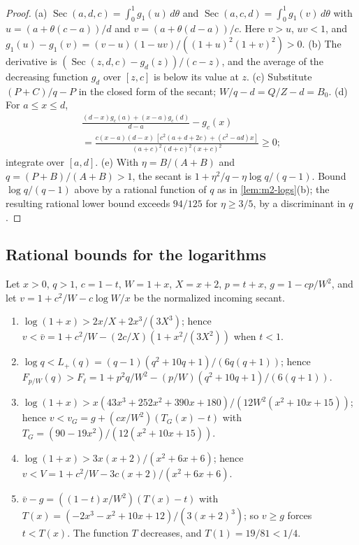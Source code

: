 \begin{proof}
(a) $\operatorname{Sec}(a,d,c)=\int_0^1g_1(u)\,d\theta$ and $\operatorname{Sec}(a,c,d)=\int_0^1g_1(v)\,d\theta$
with $u=(a+\theta(c-a))/d$ and $v=(a+\theta(d-a))/c$. Here $v>u$, $uv<1$, and
$g_1(u)-g_1(v)=(v-u)(1-uv)/((1+u)^2(1+v)^2)>0$.
(b) The derivative is $(\operatorname{Sec}(z,d,c)-g_d(z))/(c-z)$, and the average of the decreasing
function $g_d$ over $[z,c]$ is below its value at $z$.
(c) Substitute $(P+C)/q-P$ in the closed form of the secant; $W/q-d=Q/Z-d=B_0$.
(d) For $a\le x\le d$,
\begin{multline*}
\frac{(d-x)g_c(a)+(x-a)g_c(d)}{d-a}-g_c(x)\\
=\frac{c(x-a)(d-x)\,[c^2(a+d+2c)+(c^2-ad)x]}{(a+c)^2(d+c)^2(x+c)^2}\ge0;
\end{multline*}
integrate over $[a,d]$.
(e) With $\eta=B/(A+B)$ and $q=(P+B)/(A+B)>1$, the secant is $1+\eta^2/q-\eta\log q/(q-1)$.
Bound $\log q/(q-1)$ above by a rational function of $q$ as in \cref{lem:m2-logs}(b); the
resulting rational lower bound exceeds $94/125$ for $\eta\ge3/5$, by a discriminant in $q$.
\end{proof}

\subsection{Rational bounds for the logarithms}\label{app:m2-logs}

\begin{lemma}[Logarithms]\label{lem:m2-logs}
Let $x>0$, $q>1$, $c=1-t$, $W=1+x$, $X=x+2$, $p=t+x$, $g=1-cp/W^2$, and let
$v=1+c^2/W-c\log W/x$ be the normalized incoming secant.
\begin{enumerate}[label=(\alph*)]
\item $\log(1+x)>2x/X+2x^3/(3X^3)$; hence $v<\bar v=1+c^2/W-(2c/X)(1+x^2/(3X^2))$ when $t<1$.
\item $\log q<L_+(q)=(q-1)(q^2+10q+1)/(6q(q+1))$; hence
$F_{p/W}(q)>F_\ell=1+p^2q/W^2-(p/W)(q^2+10q+1)/(6(q+1))$.
\item $\log(1+x)>x(43x^3+252x^2+390x+180)/(12W^2(x^2+10x+15))$; hence
$v<v_G=g+(cx/W^2)(T_G(x)-t)$ with $T_G=(90-19x^2)/(12(x^2+10x+15))$.
\item $\log(1+x)>3x(x+2)/(x^2+6x+6)$; hence $v<V=1+c^2/W-3c(x+2)/(x^2+6x+6)$.
\item $\bar v-g=((1-t)x/W^2)(T(x)-t)$ with $T(x)=(-2x^3-x^2+10x+12)/(3(x+2)^3)$; so $v\ge g$ forces
$t<T(x)$. The function $T$ decreases, and $T(1)=19/81<1/4$.
\end{enumerate}
\end{lemma}

